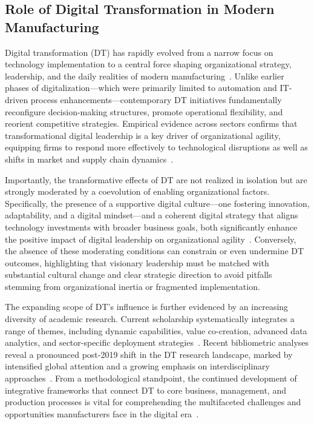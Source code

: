 \documentclass[sigconf]{acmart}
\begin{document}
\subsection{Role of Digital Transformation in Modern Manufacturing}

Digital transformation (DT) has rapidly evolved from a narrow focus on technology implementation to a central force shaping organizational strategy, leadership, and the daily realities of modern manufacturing~\cite{ref93}. Unlike earlier phases of digitalization—which were primarily limited to automation and IT-driven process enhancements—contemporary DT initiatives fundamentally reconfigure decision-making structures, promote operational flexibility, and reorient competitive strategies. Empirical evidence across sectors confirms that transformational digital leadership is a key driver of organizational agility, equipping firms to respond more effectively to technological disruptions as well as shifts in market and supply chain dynamics~\cite{ref93}. 

Importantly, the transformative effects of DT are not realized in isolation but are strongly moderated by a coevolution of enabling organizational factors. Specifically, the presence of a supportive digital culture—one fostering innovation, adaptability, and a digital mindset—and a coherent digital strategy that aligns technology investments with broader business goals, both significantly enhance the positive impact of digital leadership on organizational agility~\cite{ref93}. Conversely, the absence of these moderating conditions can constrain or even undermine DT outcomes, highlighting that visionary leadership must be matched with substantial cultural change and clear strategic direction to avoid pitfalls stemming from organizational inertia or fragmented implementation.

The expanding scope of DT's influence is further evidenced by an increasing diversity of academic research. Current scholarship systematically integrates a range of themes, including dynamic capabilities, value co-creation, advanced data analytics, and sector-specific deployment strategies~\cite{ref91}. Recent bibliometric analyses reveal a pronounced post-2019 shift in the DT research landscape, marked by intensified global attention and a growing emphasis on interdisciplinary approaches~\cite{ref91}. From a methodological standpoint, the continued development of integrative frameworks that connect DT to core business, management, and production processes is vital for comprehending the multifaceted challenges and opportunities manufacturers face in the digital era~\cite{ref91,ref93}.
\end{document}
